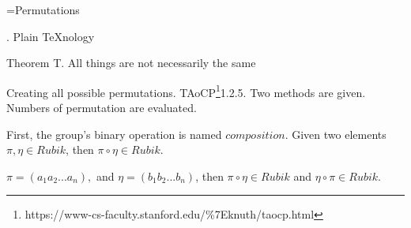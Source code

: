 
\def\a{\left(\matrix}
\def\b{\cr}
\def\c{\right)}

\def\d{\footnote*{http://web.mit.edu/sp.268/www/rubik.pdf}}
\def\f{\footnote*{https://www-cs-faculty.stanford.edu/\%7Eknuth/taocp.html}}
\def\e{\bigskip}
\def\R{{Rubik}}
\def\*{\circ}

\vsize=300pt %
\hsize=480pt %
\footline={\tenrm Permutations\quad\dotfill\quad \folio}

. Plain \TeX nology %

\proclaim Theorem T. All things are not necessarily the same

\e
Creating all possible permutations.  TAoCP\f 1.2.5.
Two methods are given.  Numbers of permutation are evaluated.

\e
First, the group's binary operation is named $composition$.
Given two elements $\pi,\eta\in\R$, then
$\pi\*\eta\in\R$.

\e
$\pi=(a_1 a_2 ... a_n),$ and $\eta=(b_1 b_2 ... b_n)$, then
$\pi\*\eta\in\R$ and $\eta\*\pi\in\R.$

\bye
